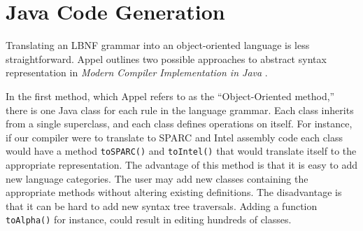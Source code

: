 \documentclass{llncs}
\newcommand{\shortsection}[1]{\subsubsection*{#1.}} %
\begin{document}










\section{Java Code Generation}

Translating an LBNF grammar into an object-oriented language is less straightforward. Appel outlines two possible approaches to abstract syntax representation in \textit{Modern Compiler Implementation in Java} \cite{AppelJ}. 

In the first method, which Appel refers to as the ``Object-Oriented method,''
there is one Java class for each rule in the language grammar. Each class
inherits from a single superclass, and each class defines operations on itself.
For instance, if our compiler were to translate to SPARC and Intel assembly code
each class would have a method \texttt{toSPARC()} and \texttt{toIntel()} that would translate itself to the appropriate representation. The advantage of this method is that
it is easy to add new language categories. The user may add
new classes containing the appropriate methods without altering existing definitions. The
disadvantage is that it can be hard to add new syntax tree traversals.
Adding a function \texttt{toAlpha()} for instance, could result in editing hundreds of classes.
\end{document}
